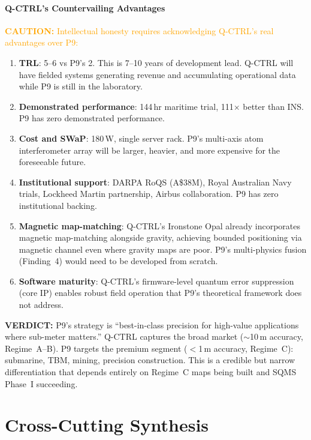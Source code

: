 \documentclass[11pt]{article}
\theoremstyle{definition}
\theoremstyle{remark}
\newcommand{\caution}[1]{\textcolor{orange}{\textbf{CAUTION:} #1}}
\newcommand{\verdict}[1]{\textcolor{green!50!black}{\textbf{VERDICT:} #1}}
\begin{document}
\subsection{Q-CTRL's Countervailing Advantages}

\caution{Intellectual honesty requires acknowledging Q-CTRL's
real advantages over P9:}
\begin{enumerate}[nosep]
\item \textbf{TRL}: 5--6 vs P9's 2. This is 7--10 years of development
  lead. Q-CTRL will have fielded systems generating revenue and
  accumulating operational data while P9 is still in the laboratory.
\item \textbf{Demonstrated performance}: 144\,hr maritime trial,
  111$\times$ better than INS. P9 has zero demonstrated performance.
\item \textbf{Cost and SWaP}: 180\,W, single server rack. P9's
  multi-axis atom interferometer array will be larger, heavier, and
  more expensive for the foreseeable future.
\item \textbf{Institutional support}: DARPA RoQS (A\$38M), Royal
  Australian Navy trials, Lockheed Martin partnership, Airbus
  collaboration. P9 has zero institutional backing.
\item \textbf{Magnetic map-matching}: Q-CTRL's Ironstone Opal
  already incorporates magnetic map-matching alongside gravity,
  achieving bounded positioning via magnetic channel even where
  gravity maps are poor. P9's multi-physics fusion (Finding~4)
  would need to be developed from scratch.
\item \textbf{Software maturity}: Q-CTRL's firmware-level quantum
  error suppression (core IP) enables robust field operation that
  P9's theoretical framework does not address.
\end{enumerate}

\verdict{P9's strategy is ``best-in-class precision for high-value
applications where sub-meter matters.'' Q-CTRL captures the broad
market ($\sim$10\,m accuracy, Regime~A--B). P9 targets the premium
segment ($<$1\,m accuracy, Regime~C): submarine, TBM, mining,
precision construction. This is a credible but narrow differentiation
that depends entirely on Regime~C maps being built and SQMS Phase~I
succeeding.}

\part{Cross-Cutting Synthesis}
\label{part:synthesis}
\end{document}

